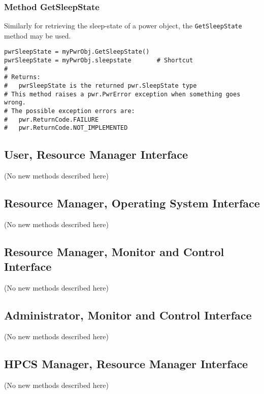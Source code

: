 \subsubsection{Method GetSleepState} \label{meth:GetSleepState}

Similarly for retrieving the sleep-state of a power object, the \texttt{GetSleepState} method may be used.
\begin{center}\begin{minipage}{.95\linewidth}\begin{lstlisting}
pwrSleepState = myPwrObj.GetSleepState()
pwrSleepState = myPwrObj.sleepstate       # Shortcut
#
# Returns:
#   pwrSleepState is the returned pwr.SleepState type
# This method raises a pwr.PwrError exception when something goes wrong.
# The possible exception errors are: 
#   pwr.ReturnCode.FAILURE
#   pwr.ReturnCode.NOT_IMPLEMENTED
\end{lstlisting}\end{minipage}\end{center}

\subsection{User, Resource Manager
Interface}\label{sec:PythonUserResourceManagerInterface}
(No new methods described here)

\subsection{Resource Manager, Operating System
Interface}\label{sec:PythonResourceManagerOSInterface}
(No new methods described here)

\subsection{Resource Manager, Monitor and Control
Interface}\label{sec:PythonResourceManagerMonitorControlInterface}
(No new methods described here)

\subsection{Administrator, Monitor and Control
Interface}\label{sec:PythonAdministratorMonitorControlInterface}
(No new methods described here)

\subsection{HPCS Manager, Resource Manager
Interface}\label{sec:PythonHPCSManagerInterface}
(No new methods described here)

